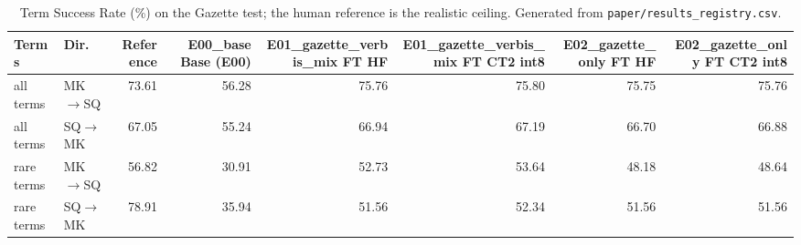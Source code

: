 \begin{table}[t]
\centering
\small
\begin{tabular}{llrrrrrr}
\toprule
Terms & Dir. & Reference & E00\_base Base (E00) & E01\_gazette\_verbis\_mix FT HF & E01\_gazette\_verbis\_mix FT CT2 int8 & E02\_gazette\_only FT HF & E02\_gazette\_only FT CT2 int8 \\
\midrule
all terms & MK$\rightarrow$SQ & 73.61 & 56.28 & 75.76 & 75.80 & 75.75 & 75.76 \\
all terms & SQ$\rightarrow$MK & 67.05 & 55.24 & 66.94 & 67.19 & 66.70 & 66.88 \\
rare terms & MK$\rightarrow$SQ & 56.82 & 30.91 & 52.73 & 53.64 & 48.18 & 48.64 \\
rare terms & SQ$\rightarrow$MK & 78.91 & 35.94 & 51.56 & 52.34 & 51.56 & 51.56 \\
\bottomrule
\end{tabular}
\caption{Term Success Rate (\%) on the Gazette test; the human reference is the realistic ceiling. Generated from \texttt{paper/results\_registry.csv}.}
\label{tab:terminology}
\end{table}
